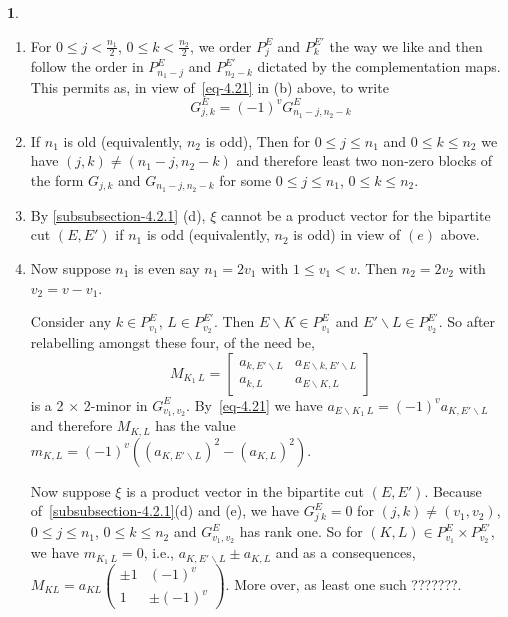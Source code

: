 \documentclass[a4paper,12pt]{article}
\theoremstyle{definition}
\theoremstyle{underlinethm}
\theoremstyle{definition}
\newtheorem{subsubsec}{}[subsection]
\begin{document}
\begin{subsubsec}
\begin{enumerate}[label=(\alph*)]
\item For $0 \leq j < \frac{n_{1}}{2}$, $0 \leq k < \frac{n_{2}}{2}$, we order $P_{j}^{E}$ and $P_{k}^{E'}$ the way we like and then follow the order in $P_{n_{1}-j}^{E}$ and $P_{n_{2}-k}^{E'}$ dictated by the complementation maps. This permits as, in view of~\eqref{eq-4.21} in (b) above, to write
\begin{equation}
G_{j,k}^{E} = (-1)^{v} G_{n_{1}-j, n_{2}-k}^{E} \tag{4.22}\label{eq-4.22}
\end{equation}

\item If $n_{1}$ is old (equivalently, $n_{2}$ is odd), Then for $0 \leq j \leq n_{1}$ and $0 \leq k \leq n_{2}$ we have $(j,k) \neq (n_{1}-j, n_{2}-k)$ and therefore least two non-zero blocks of the form $G_{j,k}$ and $G_{n_{1}-j, n_{2}-k}$ for some $0\leq j \leq n_{1}$, $0 \leq k \leq n_{2}$. 

\item By \ref{subsubsection-4.2.1} (d), $\xi$ cannot be a product vector for the bipartite cut $(E, E')$ if $n_{1}$ is odd (equivalently, $n_{2}$ is odd) in view of $(e)$ above.

\item Now suppose $n_{1}$ is even say $n_{1}=2v_{1}$ with $1 \leq v_{1} < v$. Then $n_{2}=2v_{2}$ with $v_{2}=v-v_{1}$.

Consider any $k \in P_{v_{1}}^{E}$, $L \in P_{v_{2}}^{E'}$. Then $E \smallsetminus K \in P_{v_{1}}^{E}$ and $E'\smallsetminus L \in P_{v_{2}}^{E'}$. So after relabelling amongst these four, of the need be,
\begin{equation*}
M_{K_{1}~L} = 
\begin{bmatrix}
a_{k,E' \smallsetminus L} &  a_{E \smallsetminus k, E'\smallsetminus L}\\ 
a_{k,L} & a_{E \smallsetminus K, L}\tag{4.23}\label{eq-4.23}
\end{bmatrix}
\end{equation*}
is a 2 $\times$ 2-minor in $G_{v_{1}, v_{2}}^{E}$. By~\eqref{eq-4.21} we have $a_{E \smallsetminus K_{1}~L} = (-1)^{v} a_{K, E'\smallsetminus L}$ and therefore $M_{K, L}$ has the value $m_{K,L} = (-1)^{v} \left((a_{K, E' \smallsetminus L})^{2} - (a_{K, L})^{2} \right)$.

Now suppose $\xi$ is a product vector in the bipartite cut $(E, E')$. Because of~\eqref{subsubsection-4.2.1}(d) and (e), we have $G_{j~k}^{E}=0$ for $(j,k) \neq (v_{1}, v_{2}) $, $0 \leq j \leq n_{1}$, $0 \leq k \leq n_{2}$ and $G_{v_{1}, v_{2}}^{E}$ has rank one. So for $(K, L) \in P_{v_{1}}^{E} \times P_{v_{2}}^{E'}$, we have $m_{K_{1}~L} = 0$, i.e., $a_{K, E'\smallsetminus L} \pm a_{K, L} $ and as a consequences, $M_{KL}= a_{KL}\begin{pmatrix}\pm 1 & (-1)^{v} \\ 1 & \pm (-1)^{v}\end{pmatrix}$. More over, as least one such ???????.


\end{enumerate}
\end{subsubsec}
\end{document}
